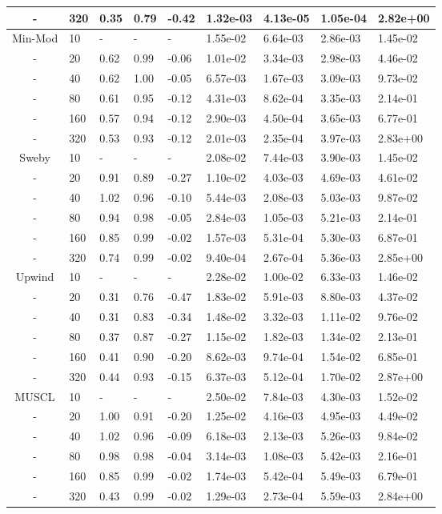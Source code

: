 \begin{table}[p]
{\begin{tabular}{cllllllll}
    - &  320 & 0.35 & 0.79 & -0.42 & 1.32e-03 & 4.13e-05 & 1.05e-04 & 2.82e+00 \\  
   \hline
     Min-Mod &   10 & - & - & - & 1.55e-02 & 6.64e-03 & 2.86e-03 & 1.45e-02  \\ 
    - &   20 & 0.62 & 0.99 & -0.06 & 1.01e-02 & 3.34e-03 & 2.98e-03 & 4.46e-02 \\  
    - &   40 & 0.62 & 1.00 & -0.05 & 6.57e-03 & 1.67e-03 & 3.09e-03 & 9.73e-02 \\  
    - &   80 & 0.61 & 0.95 & -0.12 & 4.31e-03 & 8.62e-04 & 3.35e-03 & 2.14e-01 \\  
    - &  160 & 0.57 & 0.94 & -0.12 & 2.90e-03 & 4.50e-04 & 3.65e-03 & 6.77e-01 \\  
    - &  320 & 0.53 & 0.93 & -0.12 & 2.01e-03 & 2.35e-04 & 3.97e-03 & 2.83e+00 \\  
   \hline
    Sweby &   10 & - & - & - & 2.08e-02 & 7.44e-03 & 3.90e-03 & 1.45e-02  \\ 
    - &   20 & 0.91 & 0.89 & -0.27 & 1.10e-02 & 4.03e-03 & 4.69e-03 & 4.61e-02 \\  
    - &   40 & 1.02 & 0.96 & -0.10 & 5.44e-03 & 2.08e-03 & 5.03e-03 & 9.87e-02 \\  
    - &   80 & 0.94 & 0.98 & -0.05 & 2.84e-03 & 1.05e-03 & 5.21e-03 & 2.14e-01 \\  
    - &  160 & 0.85 & 0.99 & -0.02 & 1.57e-03 & 5.31e-04 & 5.30e-03 & 6.87e-01 \\  
    - &  320 & 0.74 & 0.99 & -0.02 & 9.40e-04 & 2.67e-04 & 5.36e-03 & 2.85e+00 \\  
   \hline
    Upwind &   10 & - & - & - & 2.28e-02 & 1.00e-02 & 6.33e-03 & 1.46e-02  \\ 
    - &   20 & 0.31 & 0.76 & -0.47 & 1.83e-02 & 5.91e-03 & 8.80e-03 & 4.37e-02 \\  
    - &   40 & 0.31 & 0.83 & -0.34 & 1.48e-02 & 3.32e-03 & 1.11e-02 & 9.76e-02 \\  
    - &   80 & 0.37 & 0.87 & -0.27 & 1.15e-02 & 1.82e-03 & 1.34e-02 & 2.13e-01 \\  
    - &  160 & 0.41 & 0.90 & -0.20 & 8.62e-03 & 9.74e-04 & 1.54e-02 & 6.85e-01 \\  
    - &  320 & 0.44 & 0.93 & -0.15 & 6.37e-03 & 5.12e-04 & 1.70e-02 & 2.87e+00 \\  
   \hline
    MUSCL &   10 & - & - & - & 2.50e-02 & 7.84e-03 & 4.30e-03 & 1.52e-02  \\ 
    - &   20 & 1.00 & 0.91 & -0.20 & 1.25e-02 & 4.16e-03 & 4.95e-03 & 4.49e-02 \\  
    - &   40 & 1.02 & 0.96 & -0.09 & 6.18e-03 & 2.13e-03 & 5.26e-03 & 9.84e-02 \\  
    - &   80 & 0.98 & 0.98 & -0.04 & 3.14e-03 & 1.08e-03 & 5.42e-03 & 2.16e-01 \\  
    - &  160 & 0.85 & 0.99 & -0.02 & 1.74e-03 & 5.42e-04 & 5.49e-03 & 6.79e-01 \\  
    - &  320 & 0.43 & 0.99 & -0.02 & 1.29e-03 & 2.73e-04 & 5.59e-03 & 2.84e+00 \\  
   \hline
   \end{tabular}
   }
\end{table}